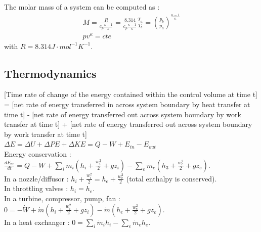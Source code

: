 \documentclass[../main.tex]{subfiles}
\begin{document}
\warning The molar mass of a system can be computed as : \begin{equation}
\begin{gathered}
    M = \frac{R}{c_p \frac{\kappa-1}{\kappa}} = \frac{8.314}{c_p \frac{\kappa-1}{\kappa}}
    \frac{T_a}{T_b} = (\frac{p_b}{p_a})^{\frac{\kappa-1}{\kappa}}\\
    pv^\kappa = cte
\end{gathered}
\end{equation}
with $R = 8.314 J\cdot mol^{-1} K^{-1}$.\\

\subsection{Thermodynamics}
[Time rate of change of the energy contained within the control volume at time t] = [net rate of energy transferred in across system boundary by heat transfer at time t] - [net rate of energy transferred out across system boundary by work transfer at time t] + [net rate of energy transferred out across system boundary by work transfer at time t]\\
$\Delta E = \Delta U + \Delta PE + \Delta KE = Q-W+E_{in}-E_{out}$\\

Energy conservation : $\frac{dE_{cv}}{dt} = \dot{Q}-\dot{W} + \sum_i \dot{m}_i (h_i + \frac{w_i^2}{2} + gz_i) - \sum_e \dot{m}_e (h_3 + \frac{w_e^2}{2}+gz_e)$.\\
In a nozzle/diffusor : $h_i+\frac{w_i^2}{2} = h_e+\frac{w_e^2}{2}$ (total enthalpy is conserved).\\
In throttling valves : $h_i=h_e$.\\
In a turbine, compressor, pump, fan : $0=-\dot{W} + \dot{m}(h_i + \frac{w_i^2}{2} + gz_i)-\dot{m}(h_e + \frac{w_e^2}{2} + gz_e)$.\\
In a heat exchanger : $0 = \sum_i \dot{m}_i h_i - \sum_e \dot{m}_e h_e$.\\
\end{document}
